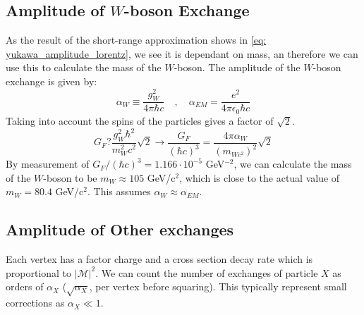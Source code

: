 \subsection{Amplitude of $W$-boson Exchange}
As the result of the short-range approximation shows in \cref{eq: yukawa_amplitude_lorentz}, we see it is dependant on mass, an therefore we can use this to calculate the mass of the $W$-boson. The amplitude of the $W$-boson exchange is given by:
\begin{equation}
  α_{W} ≡ \frac{g^2_{W}}{4πℏc}  \quad , \quad  α_{EM} = \frac{e^2}{4πϵ_0ℏc}
\end{equation}
Taking into account the spins of the particles gives a factor of $\sqrt{2}$. 
\begin{equation}
  G_{F} ? \frac{g^2_{W}ℏ^2}{m^2_{W}c^2}\sqrt{2} → \frac{G_{F}}{(ℏc)^3} = \frac{4πα_{W}}{(m_{Wc^2})^2} \sqrt{2}
\end{equation}
By measurement of $G_{F} / (ℏc)^3 = 1.166 ⋅  10^{-5}$ GeV$^{-2}$, we can calculate the mass of the $W$-boson to be $m_{W} ≈ 105$ GeV/c$^2$, which is close to the actual value of $m_{W} = 80.4$ GeV/c$^2$. This assumes $α_{W} ≈ α_{EM}$. 

\subsection{Amplitude of Other exchanges}
Each vertex has a factor charge and a cross section decay rate which is proportional to $\left|\mathcal{M}\right|^2$. We can count the number of exchanges of particle $X$ as orders of $α_{X}$ ($\sqrt{α_{X}}$, per vertex before squaring). This typically represent small corrections as $α_{X} ≪ 1$. 

